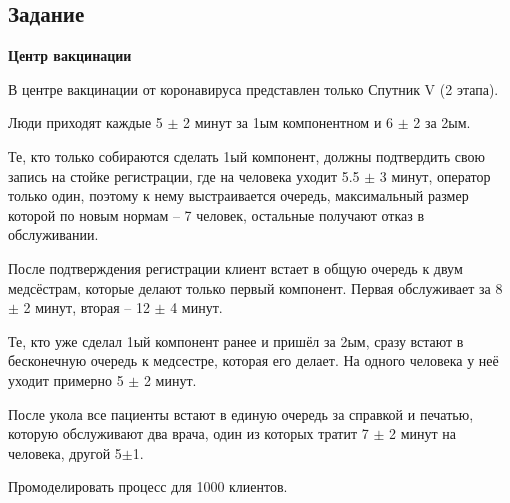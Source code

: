 
\subsection{Задание}
\textbf{Центр вакцинации}
  
В центре вакцинации от коронавируса представлен только Спутник V (2 этапа).

Люди приходят каждые 5 $\pm$ 2 минут за 1ым компонентном и 6 $\pm$ 2 за 2ым. 

Те, кто только собираются сделать 1ый компонент, должны подтвердить свою запись на стойке регистрации, где на человека уходит 5.5 $\pm$ 3 минут, оператор только один, поэтому к нему выстраивается очередь, максимальный размер которой по новым нормам -- 7 человек, остальные получают отказ в обслуживании. 

После подтверждения регистрации клиент встает в общую очередь к двум медсёстрам, которые делают только первый компонент. Первая обслуживает за 8 $\pm$ 2 минут, вторая -- 12 $\pm$ 4 минут. 

Те, кто уже сделал 1ый компонент ранее и пришёл за 2ым, сразу встают в бесконечную очередь к медсестре, которая его делает. На одного человека у неё уходит примерно 5 $\pm$ 2 минут. 

После укола все пациенты встают в единую очередь за справкой и печатью, которую обслуживают два врача, один из которых тратит 7 $\pm$ 2 минут на человека, другой 5$\pm$1.

Промоделировать процесс для 1000 клиентов.